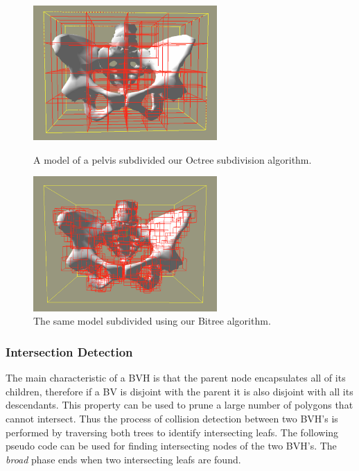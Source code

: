     \begin{figure}
    \begin{minipage}[t]{6cm}
    \begin{center}
    \includegraphics[width=70mm]{sections/methodology/images/contact/bvh-octree.png}
    \caption[A model of a pelvis with its BVH created using our Octree subdivision algorithm.]{\label{contact-octree} A model of a pelvis subdivided our Octree subdivision algorithm.}
    \end{center}
    \end{minipage}
    \hfill
    \begin{minipage}[t]{6cm}
    \begin{center}
    \includegraphics[width=70mm]{sections/methodology/images/contact/bvh-bitree.png}
    \caption[The same model subdivided using our Bitree algorithm.]{\label{contact-bitree} The same model subdivided using our Bitree algorithm.}
    \end{center}
    \end{minipage}
    \end{figure}

    \subsubsection{Intersection Detection}
    The main characteristic of a BVH is that the parent node encapsulates all of its children, therefore if a BV is disjoint with the parent it is also disjoint with all its descendants. This property can be used to prune a large number of polygons that cannot intersect. Thus the process of collision detection between two BVH's is performed by traversing both trees to identify intersecting leafs. The following pseudo code can be used for finding intersecting nodes of the two BVH's. The \emph{broad} phase ends when two intersecting leafs are found.


